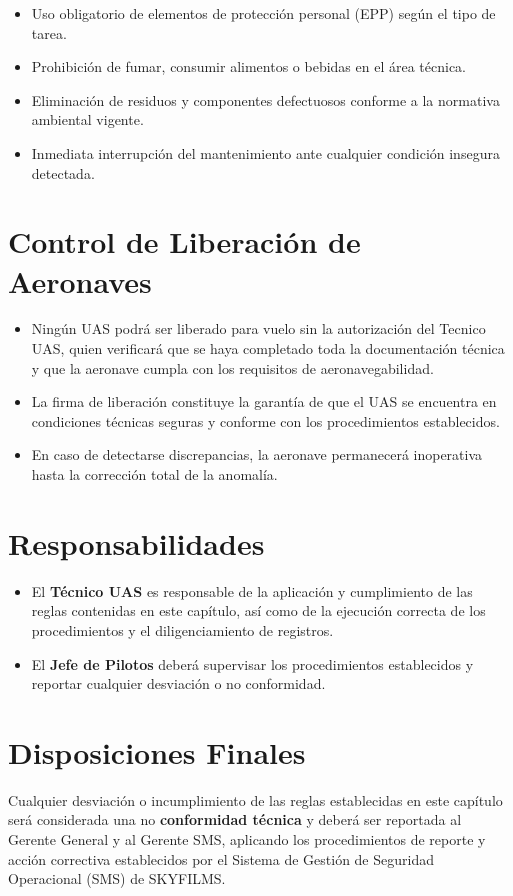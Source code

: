 \begin{itemize}
    \item Uso obligatorio de elementos de protección personal (EPP) según el tipo de tarea.

    \item Prohibición de fumar, consumir alimentos o bebidas en el área técnica.

    \item Eliminación de residuos y componentes defectuosos conforme a la normativa ambiental vigente.

    \item Inmediata interrupción del mantenimiento ante cualquier condición insegura detectada.
\end{itemize}

\section{Control de Liberación de Aeronaves}

\begin{itemize}
    \item Ningún UAS podrá ser liberado para vuelo sin la autorización del Tecnico UAS, quien verificará que se haya completado toda la documentación técnica y que la aeronave cumpla con los requisitos de aeronavegabilidad.

    \item La firma de liberación constituye la garantía de que el UAS se encuentra en condiciones técnicas seguras y conforme con los procedimientos establecidos.

    \item En caso de detectarse discrepancias, la aeronave permanecerá inoperativa hasta la corrección total de la anomalía.
\end{itemize}

\section{Responsabilidades}

\begin{itemize}
    \item El \textbf{Técnico UAS} es responsable de la aplicación y cumplimiento de las reglas contenidas en este capítulo, así como de la ejecución correcta de los procedimientos y el diligenciamiento de registros.

    \item El \textbf{Jefe de Pilotos} deberá supervisar los procedimientos establecidos y reportar cualquier desviación o no conformidad.
\end{itemize}

\section{Disposiciones Finales}
Cualquier desviación o incumplimiento de las reglas establecidas en este capítulo será considerada una no \textbf{conformidad técnica} y deberá ser reportada al Gerente General y al Gerente SMS, aplicando los procedimientos de reporte y acción correctiva establecidos por el Sistema de Gestión de Seguridad Operacional (SMS) de SKYFILMS.